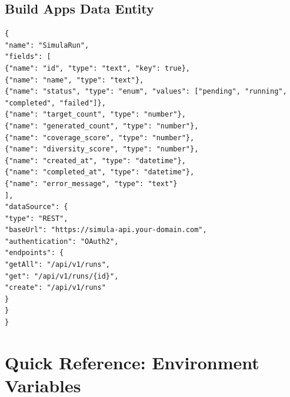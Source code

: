 \documentclass[12pt,a4paper,twoside]{report}
\begin{document}
\subsection{Build Apps Data Entity}

\begin{lstlisting}[language=jsonx,caption={Build Apps data entity for generation runs}]
{
"name": "SimulaRun",
"fields": [
{"name": "id", "type": "text", "key": true},
{"name": "name", "type": "text"},
{"name": "status", "type": "enum", "values": ["pending", "running", "completed", "failed"]},
{"name": "target_count", "type": "number"},
{"name": "generated_count", "type": "number"},
{"name": "coverage_score", "type": "number"},
{"name": "diversity_score", "type": "number"},
{"name": "created_at", "type": "datetime"},
{"name": "completed_at", "type": "datetime"},
{"name": "error_message", "type": "text"}
],
"dataSource": {
"type": "REST",
"baseUrl": "https://simula-api.your-domain.com",
"authentication": "OAuth2",
"endpoints": {
"getAll": "/api/v1/runs",
"get": "/api/v1/runs/{id}",
"create": "/api/v1/runs"
}
}
}
\end{lstlisting}


\section{Quick Reference: Environment Variables}
\end{document}
